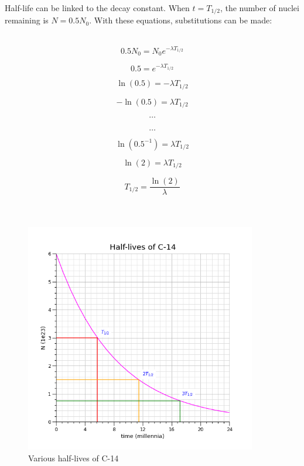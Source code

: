 \documentclass[10pt]{article}
\begin{document}
Half-life can be linked to the decay constant. When \(t= T_{1/2}\), the number of nuclei remaining is \(N = 0.5N_0\). With these equations, substitutions can be made:


\begin{figure}[H]
\centering
\begin{minipage}{0.8\textwidth}
\begin{tcolorbox}[
sharp corners=all,
colback=white,
colframe=white,
size=tight,
boxrule=0.2mm,
left=10mm, right=10mm,
]
\begin{multicols}{2}
\noindent
\\
\[0.5N_0 = N_0 e^{-\lambda T_{1/2}}\]

\[0.5 = e^{-\lambda T_{1/2}}\]

\[\ln (0.5) = -\lambda T_{1/2}\]

\[-\ln (0.5) = \lambda T_{1/2}\]

\[\textbf{\ldots}\]
\columnbreak
\\
\[\textbf{\ldots}\]

\[\ln (0.5^{-1}) = \lambda T_{1/2}\]

\[\ln (2) = \lambda T_{1/2}\]

\[T_{1/2} = \dfrac{\ln(2)}{\lambda}\]
\\
\\
\end{multicols}
\end{tcolorbox}
\end{minipage}
\end{figure}

\begin{figure}[H]
\centering
\includegraphics[width=0.9\textwidth,keepaspectratio]{./images/c-14_t_half.png}
\caption{Various half-lives of C-14}
\end{figure}
\end{document}
